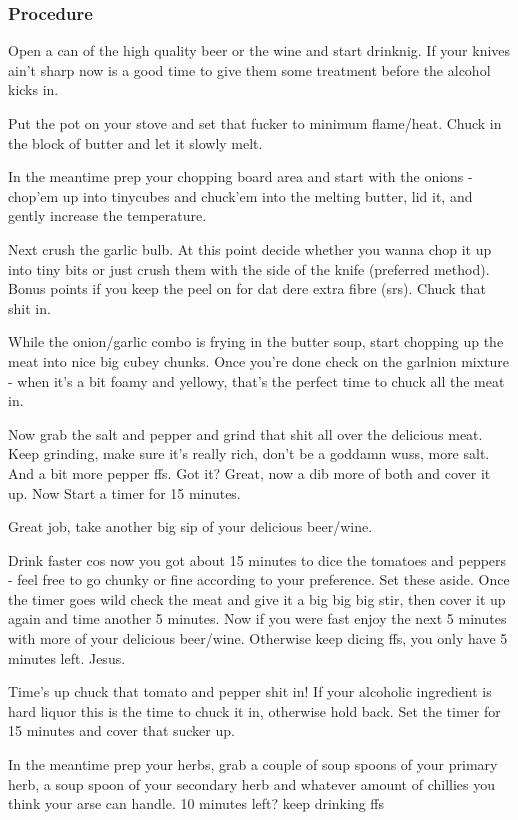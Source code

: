 \documentclass[10pt]{article}
\begin{document}
\subsubsection{Procedure}%
\label{ssub:goulash_procedure}
Open a can of the high quality beer or the wine and start drinknig. If your knives ain't sharp now is a good time to give them some treatment before the alcohol kicks in.\par
Put the pot on your stove and set that fucker to minimum flame/heat. Chuck in the block of butter and let it slowly melt.\par
In the meantime prep your chopping board area and start with the onions - chop'em up into tinycubes and chuck'em into the melting butter, lid it, and gently increase the temperature.\par
Next crush the garlic bulb. At this point decide whether you wanna chop it up into tiny bits or just crush them with the side of the knife (preferred method). Bonus points if you keep the peel on for dat dere extra fibre (srs). Chuck that shit in.\par
While the onion/garlic combo is frying in the butter soup, start chopping up the meat into nice big cubey chunks. Once you're done check on the garlnion mixture - when it's a bit foamy and yellowy, that's the perfect time to chuck all the meat in.\par
Now grab the salt and pepper and grind that shit all over the delicious meat. Keep grinding, make sure it's really rich, don't be a goddamn wuss, more salt. And a bit more pepper ffs. Got it? Great, now a dib more of both and cover it up. Now Start a timer for 15 minutes.\par
Great job, take another big sip of your delicious beer/wine.\par
Drink faster cos now you got about 15 minutes to dice the tomatoes and peppers - feel free to go chunky or fine according to your preference. Set these aside. Once the timer goes wild check the meat and give it a big big big stir, then cover it up again and time another 5 minutes. Now if you were fast enjoy the next 5 minutes with more of your delicious beer/wine. Otherwise keep dicing ffs, you only have 5 minutes left. Jesus.\par
Time's up chuck that tomato and pepper shit in! If your alcoholic ingredient is hard liquor this is the time to chuck it in, otherwise hold back. Set the timer for 15 minutes and cover that sucker up.\par
In the meantime prep your herbs, grab a couple of soup spoons of your primary herb, a soup spoon of your secondary herb and whatever amount of chillies you think your arse can handle. 10 minutes left? keep drinking ffs\par
\end{document}
